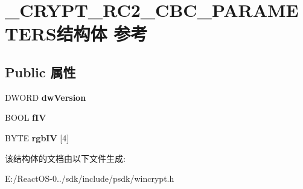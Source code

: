 \hypertarget{struct___c_r_y_p_t___r_c2___c_b_c___p_a_r_a_m_e_t_e_r_s}{}\section{\+\_\+\+C\+R\+Y\+P\+T\+\_\+\+R\+C2\+\_\+\+C\+B\+C\+\_\+\+P\+A\+R\+A\+M\+E\+T\+E\+R\+S结构体 参考}
\label{struct___c_r_y_p_t___r_c2___c_b_c___p_a_r_a_m_e_t_e_r_s}
\subsection*{Public 属性}
\begin{DoxyCompactItemize}
\item 
\mbox{\label{struct___c_r_y_p_t___r_c2___c_b_c___p_a_r_a_m_e_t_e_r_s_a8f03e7ad73f39abf775f13d54c7de575}} 
D\+W\+O\+RD {\bfseries dw\+Version}
\item 
\mbox{\label{struct___c_r_y_p_t___r_c2___c_b_c___p_a_r_a_m_e_t_e_r_s_adc4b600dbc691a49ec182988480ce583}} 
B\+O\+OL {\bfseries f\+IV}
\item 
\mbox{\label{struct___c_r_y_p_t___r_c2___c_b_c___p_a_r_a_m_e_t_e_r_s_a08f57152da795eb7976a3c41b028138a}} 
B\+Y\+TE {\bfseries rgb\+IV} \mbox{[}4\mbox{]}
\end{DoxyCompactItemize}


该结构体的文档由以下文件生成\+:\begin{DoxyCompactItemize}
\item 
E\+:/\+React\+O\+S-\/0../sdk/include/psdk/wincrypt.\+h\end{DoxyCompactItemize}
